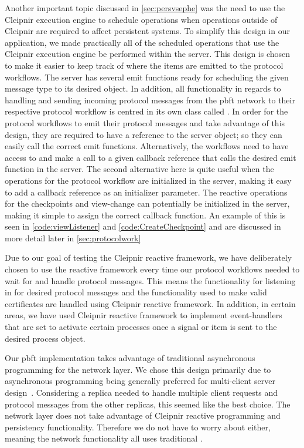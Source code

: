 Another important topic discussed in \autoref{sec:persvsephe} was the need to use the Cleipnir execution engine to schedule operations when operations outside of Cleipnir are required to affect persistent systems. To simplify this design in our application, we made practically all of the scheduled operations that use the Cleipnir execution engine be performed within the server. This design is chosen to make it easier to keep track of where the items are emitted to the protocol workflows. The server has several emit functions ready for scheduling the given message type to its desired  object. In addition, all functionality in regards to handling and sending incoming protocol messages from the \ac{pbft} network to their respective protocol workflow is centred in its own class called . In order for the protocol workflows to emit their protocol messages and take advantage of this design, they are required to have a reference to the server object; so they can easily call the correct emit functions. Alternatively, the workflows need to have access to and make a call to a given callback reference that calls the desired emit function in the server. The second alternative here is quite useful when the operations for the protocol workflow are initialized in the server, making it easy to add a callback reference as an initializer parameter. The reactive operations for the checkpoints and view-change can potentially be initialized in the server, making it simple to assign the correct callback function. An example of this is seen in \autoref{code:viewListener} and \autoref{code:CreateCheckpoint} and are discussed in more detail later in \autoref{sec:protocolwork}

Due to our goal of testing the Cleipnir reactive framework, we have deliberately chosen to use the reactive framework every time our protocol workflows needed to wait for and handle protocol messages. This means the functionality for listening in for desired protocol messages and the functionality used to make valid certificates are handled using Cleipnir reactive framework. In addition, in certain areas, we have used Cleipnir reactive framework to implement event-handlers that are set to activate certain processes once a signal or item is sent to the desired process  object.

Our \ac{pbft} implementation takes advantage of traditional asynchronous programming for the network layer. We chose this design primarily due to asynchronous programming being generally preferred for multi-client server design~\cite{VIDEO:AsyncConBack, DOC:AsyncAwait}. Considering a replica needed to handle multiple client requests and protocol messages from the other replicas, this seemed like the best choice. The network layer does not take advantage of Cleipnir reactive programming and persistency functionality. Therefore we do not have to worry about  either, meaning the network functionality all uses traditional .


